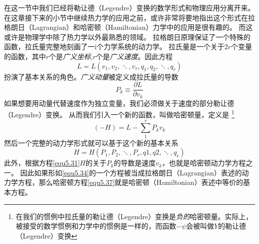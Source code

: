 在这一节中我们已经将勒让德（Legendre）变换的数学形式和物理应用分离开来。
在这章接下来的小节中继续热力学的应用之前，或许非常将要地指出这个形式在拉格朗日（Lagrangian）和哈密顿（Hamiltonian）力学中的应用是很有趣的。
而这或许是物理学中除了热力学以外最熟悉的领域。
拉格朗日原理保证了一个特殊的函数，拉氏量完整地刻画了一i个力学系统的动力学。
拉氏量是一个关于$2r$个变量的函数，其中$r$个是{\it 广义坐标},$r$个是{\it 广义速度}。因此方程
\begin{equation}
\label{equ5.34}
  L=L(v_1,v_2,\ddots,v_r,q_1,q_2,\ddots,q_r)
\end{equation}
扮演了基本关系的角色。{\it 广义动量}被定义成拉氏量的导数
\begin{equation}
\label{equ5.35}
	P_k \equiv \frac{\partial L}{\partial v_k}
\end{equation}
如果想要用动量代替速度作为独立变量，我们必须做关于速度的部分勒让德（Legendre）变换。
从而我们引入一个新的函数，叫做哈密顿量，定义是
\footnote{在我们的惯例中拉氏量的勒让德（Legendre）变换是{\it 负的}哈密顿量。实际上，被接受的数学惯例和力学中的惯例是一样的，而函数$-\psi$会被叫做$Y$的勒让德（Legendre）变换}
\begin{equation}
\label{equ5.36}
  (-H)=L-\sum_1^rP_kv_k
\end{equation}
然后一个完整的动力学形式就可以基于这个新的基本关系
\begin{equation}
\label{equ5.37}
  H=H(P_1,P_2,\ddots,P_r,q1,q2,\ddots,q_r)
\end{equation}
此外，根据方程\eqref{equ5.31}$H$的关于$P_k$的导数是速度$v_k$，也就是哈密顿动力学方程之一。
因此如果形如\eqref{equ5.34}的一个方程被当成拉格朗日（Lagrangian）表述的动力学方程，那么哈密顿方程\eqref{equ5.37}就是哈密顿（Hamiltonian）表述中等价的基本方程。
